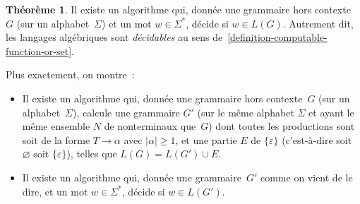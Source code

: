 \documentclass[12pt,a4paper]{article}
\theoremstyle{definition}
\newtheorem{thm}[comcnt]{Théorème}
\begin{document}
\begin{thm}\label{algebraic-languages-are-decidable}
Il existe un algorithme qui, donnée une grammaire hors contexte $G$
(sur un alphabet $\Sigma$) et un mot $w \in \Sigma^*$, décide si $w
\in L(G)$.  Autrement dit, les langages algébriques sont
\emph{décidables} au sens
de \ref{definition-computable-function-or-set}.

Plus exactement, on montre :
\begin{itemize}
\item Il existe un algorithme qui, donnée une grammaire
  hors contexte $G$ (sur un alphabet $\Sigma$), calcule une grammaire
  $G'$ (sur le même alphabet $\Sigma$ et ayant le même ensemble $N$ de
  nonterminaux que $G$) dont toutes les productions sont soit de la
  forme $T \rightarrow \alpha$ avec $|\alpha| \geq 1$, et une partie
  $E$ de $\{\varepsilon\}$ (c'est-à-dire soit $\varnothing$ soit
  $\{\varepsilon\}$), telles que $L(G) = L(G') \cup E$.
\item Il existe un algorithme qui, donnée une grammaire $G'$ comme on
  vient de le dire, et un mot $w \in \Sigma^*$, décide si $w \in
  L(G')$.
\end{itemize}
\end{thm}
\end{document}
